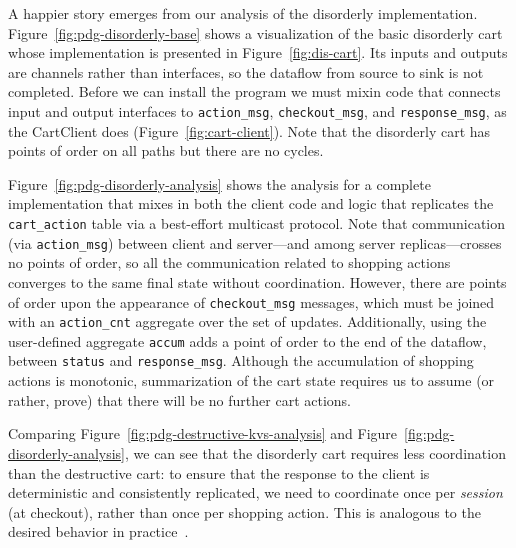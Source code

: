 A happier story emerges from our analysis of the disorderly implementation.
Figure~\ref{fig:pdg-disorderly-base} shows a visualization of the basic
disorderly cart whose implementation is presented in Figure~\ref{fig:dis-cart}.
Its inputs and outputs are channels rather than interfaces, so the dataflow from
source to sink is not completed.  Before we can install the program we must
mixin code that connects input and output interfaces to \texttt{action\_msg},
\texttt{checkout\_msg}, and \texttt{response\_msg}, as the CartClient does
(Figure~\ref{fig:cart-client}).  Note that the disorderly cart has points of
order on all paths but there are no cycles.

Figure~\ref{fig:pdg-disorderly-analysis} shows the analysis for a complete
implementation that mixes in both the client code and logic that replicates the
\texttt{cart\_action} table via a best-effort multicast protocol.  Note that
communication (via \texttt{action\_msg}) between client and server---and among
server replicas---crosses no points of order, so all the communication related
to shopping actions converges to the same final state without coordination.
However, there are points of order upon the appearance of \texttt{checkout\_msg}
messages, which must be joined with an \texttt{action\_cnt} aggregate over the
set of updates.  
Additionally, using the user-defined aggregate \texttt{accum} adds a
point of order to the end of the dataflow, between \texttt{status} and 
\texttt{response\_msg}.
Although the accumulation of shopping actions is monotonic,
summarization of the cart state requires us to assume (or rather, prove) that
there will be no further cart actions.

Comparing Figure~\ref{fig:pdg-destructive-kvs-analysis} and
Figure~\ref{fig:pdg-disorderly-analysis}, we can see that the disorderly cart
requires less coordination than the destructive cart: to ensure that the
response to the client is deterministic and consistently replicated, we need to
coordinate once per {\em session} (at checkout), rather than once per shopping
action.  This is analogous to the desired behavior in practice~\cite{quicksand}.
%

